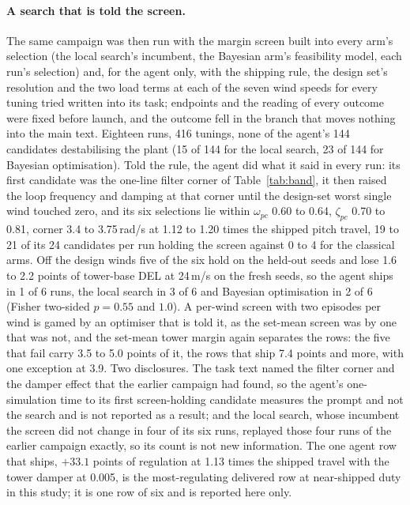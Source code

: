 \documentclass{article}
\begin{document}
\paragraph{A search that is told the screen.} The same campaign was then run with the margin screen built into every arm's selection (the local search's incumbent, the Bayesian arm's feasibility model, each run's selection) and, for the agent only, with the shipping rule, the design set's resolution and the two load terms at each of the seven wind speeds for every tuning tried written into its task; endpoints and the reading of every outcome were fixed before launch, and the outcome fell in the branch that moves nothing into the main text. Eighteen runs, 416 tunings, none of the agent's 144 candidates destabilising the plant (15 of 144 for the local search, 23 of 144 for Bayesian optimisation). Told the rule, the agent did what it said in every run: its first candidate was the one-line filter corner of Table~\ref{tab:band}, it then raised the loop frequency and damping at that corner until the design-set worst single wind touched zero, and its six selections lie within $\omega_{pc}$ 0.60 to 0.64, $\zeta_{pc}$ 0.70 to 0.81, corner 3.4 to 3.75\,rad/s at 1.12 to 1.20 times the shipped pitch travel, 19 to 21 of its 24 candidates per run holding the screen against 0 to 4 for the classical arms. Off the design winds five of the six hold on the held-out seeds and lose 1.6 to 2.2 points of tower-base DEL at 24\,m/s on the fresh seeds, so the agent ships in 1 of 6 runs, the local search in 3 of 6 and Bayesian optimisation in 2 of 6 (Fisher two-sided $p = 0.55$ and $1.0$). A per-wind screen with two episodes per wind is gamed by an optimiser that is told it, as the set-mean screen was by one that was not, and the set-mean tower margin again separates the rows: the five that fail carry 3.5 to 5.0 points of it, the rows that ship 7.4 points and more, with one exception at 3.9. Two disclosures. The task text named the filter corner and the damper effect that the earlier campaign had found, so the agent's one-simulation time to its first screen-holding candidate measures the prompt and not the search and is not reported as a result; and the local search, whose incumbent the screen did not change in four of its six runs, replayed those four runs of the earlier campaign exactly, so its count is not new information. The one agent row that ships, $+33.1$ points of regulation at 1.13 times the shipped travel with the tower damper at 0.005, is the most-regulating delivered row at near-shipped duty in this study; it is one row of six and is reported here only.
\end{document}
